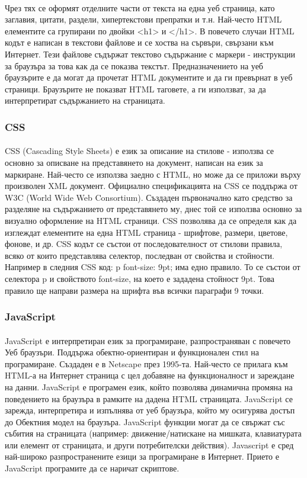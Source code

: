 \documentclass[pdftex,14pt,a4paper]{extreport}
\begin{document}
\paragraph {}
Чрез тях се оформят отделните части от текста на една уеб страница, като заглавия, цитати, раздели, хипертекстови препратки и т.н. Най-често HTML елементите са групирани по двойки <h1> и </h1>.
В повечето случаи HTML кодът е написан в текстови файлове и се хоства на сървъри, свързани към Интернет. Тези файлове съдържат текстово съдържание с маркери - инструкции за браузъра за това как да се показва текстът. Предназначението на уеб браузърите е да могат да прочетат HTML документите и да ги превърнат в уеб страници. Браузърите не показват HTML таговете, а ги използват, за да интерпретират съдържанието на страницата.
\subsubsection {CSS}
\paragraph {}
CSS (Cascading Style Sheets) е език за описание на стилове - използва се основно за описване на представянето на документ, написан на език за маркиране. Най-често се използва заедно с HTML, но може да се приложи върху произволен XML документ. Официално спецификацията на CSS се поддържа от W3C (World Wide Web Consortium). Създаден първоначално като средство за разделяне на съдържанието от представянето му, днес той се използва основно за визуално оформление на HTML страници.
CSS позволява да се определя как да изглеждат елементите на една HTML страница - шрифтове, размери, цветове, фонове, и др. CSS кодът се състои от последователност от стилови правила, всяко от които представлява селектор, последван от свойства и стойности. Например в следния CSS код:
p {font-size: 9pt;} има едно правило. То се състои от селектора p и свойството font-size, на което е зададена стойност 9pt. Това правило ще направи размера на шрифта във всички параграфи 9 точки.
\subsubsection {JavaScript}
\paragraph {}
JavaScript е интерпретиран език за програмиране, разпространяван с повечето Уеб браузъри. Поддържа обектно-ориентиран и функционален стил на програмиране. Създаден е в Netscape през 1995-та. Най-често се прилага към HTML-а на Интернет страница с цел добавяне на функционалност и зареждане на данни. JavaScript е програмен език, който позволява динамична промяна на поведението на браузъра в рамките на дадена HTML страницата. JavaScript се зарежда, интерпретира и изпълнява от уеб браузъра, който му осигурява достъп до Обектния модел на браузъра. JavaScript функции могат да се свържат със събития на страницата (например: движение/натискане на мишката, клавиатурата или елемент от страницата, и други потребителски действия). Javascript е сред най-широко разпространените езици за програмиране в Интернет. Прието е JavaScript програмите да се наричат скриптове.
\end{document}
